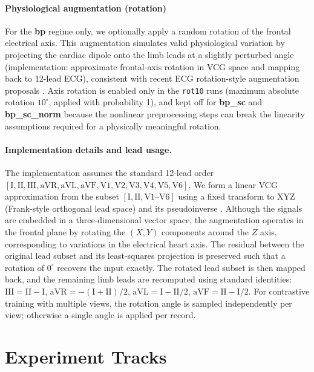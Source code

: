 \paragraph*{Physiological augmentation (rotation)}
For the \textbf{bp} regime only, we optionally apply a random rotation of the frontal electrical axis. This augmentation simulates valid physiological variation by projecting the cardiac dipole onto the limb leads at a slightly perturbed angle (implementation: approximate frontal-axis rotation in VCG space and mapping back to 12-lead ECG), consistent with recent ECG rotation-style augmentation proposals \parencite{qiu_augmentation_2022}.
Axis rotation is enabled only in the \texttt{rot10} runs (maximum absolute rotation $10^\circ$, applied with probability 1), and kept off for \textbf{bp\_sc} and \textbf{bp\_sc\_norm} because the nonlinear preprocessing steps can break the linearity assumptions required for a physically meaningful rotation.

\paragraph{Implementation details and lead usage.}
The implementation assumes the standard 12-lead order
$[\mathrm{I}, \mathrm{II}, \mathrm{III}, \mathrm{aVR}, \mathrm{aVL}, \mathrm{aVF}, \mathrm{V1}, \mathrm{V2}, \mathrm{V3}, \mathrm{V4}, \mathrm{V5}, \mathrm{V6}]$.
We form a linear VCG approximation from the subset
$[\mathrm{I}, \mathrm{II}, \mathrm{V1}\text{--}\mathrm{V6}]$ using a fixed transform to XYZ (Frank-style orthogonal lead space) and its pseudoinverse \parencite{frank_vcg_1956,vcg_conversion_2007}.
Although the signals are embedded in a three-dimensional vector space, the augmentation operates in the frontal plane by rotating the $(X,Y)$ components around the $Z$ axis, corresponding to variations in the electrical heart axis.
The residual between the original lead subset and its least-squares projection is preserved such that a rotation of $0^\circ$ recovers the input exactly.
The rotated lead subset is then mapped back, and the remaining limb leads are recomputed using standard identities:
$\mathrm{III}=\mathrm{II}-\mathrm{I}$,
$\mathrm{aVR}=-(\mathrm{I}+\mathrm{II})/2$,
$\mathrm{aVL}=\mathrm{I}-\mathrm{II}/2$,
$\mathrm{aVF}=\mathrm{II}-\mathrm{I}/2$.
For contrastive training with multiple views, the rotation angle is sampled independently per view; otherwise a single angle is applied per record.

\section{Experiment Tracks}
\label{sec:track-definitions}

